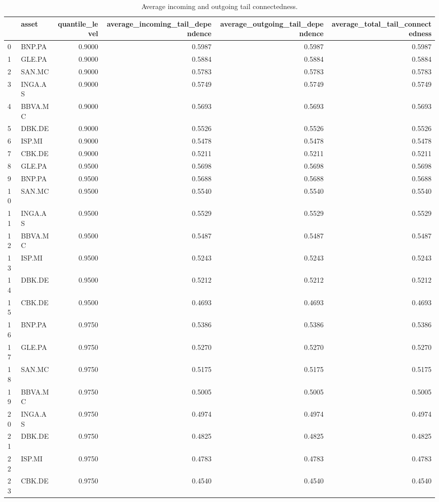 \begin{table}
\caption{Average incoming and outgoing tail connectedness.}
\label{tab:tail_connectedness_summary}
\begin{tabular}{llrrrr}
\toprule
 & asset & quantile_level & average_incoming_tail_dependence & average_outgoing_tail_dependence & average_total_tail_connectedness \\
\midrule
0 & BNP.PA & 0.9000 & 0.5987 & 0.5987 & 0.5987 \\
1 & GLE.PA & 0.9000 & 0.5884 & 0.5884 & 0.5884 \\
2 & SAN.MC & 0.9000 & 0.5783 & 0.5783 & 0.5783 \\
3 & INGA.AS & 0.9000 & 0.5749 & 0.5749 & 0.5749 \\
4 & BBVA.MC & 0.9000 & 0.5693 & 0.5693 & 0.5693 \\
5 & DBK.DE & 0.9000 & 0.5526 & 0.5526 & 0.5526 \\
6 & ISP.MI & 0.9000 & 0.5478 & 0.5478 & 0.5478 \\
7 & CBK.DE & 0.9000 & 0.5211 & 0.5211 & 0.5211 \\
8 & GLE.PA & 0.9500 & 0.5698 & 0.5698 & 0.5698 \\
9 & BNP.PA & 0.9500 & 0.5688 & 0.5688 & 0.5688 \\
10 & SAN.MC & 0.9500 & 0.5540 & 0.5540 & 0.5540 \\
11 & INGA.AS & 0.9500 & 0.5529 & 0.5529 & 0.5529 \\
12 & BBVA.MC & 0.9500 & 0.5487 & 0.5487 & 0.5487 \\
13 & ISP.MI & 0.9500 & 0.5243 & 0.5243 & 0.5243 \\
14 & DBK.DE & 0.9500 & 0.5212 & 0.5212 & 0.5212 \\
15 & CBK.DE & 0.9500 & 0.4693 & 0.4693 & 0.4693 \\
16 & BNP.PA & 0.9750 & 0.5386 & 0.5386 & 0.5386 \\
17 & GLE.PA & 0.9750 & 0.5270 & 0.5270 & 0.5270 \\
18 & SAN.MC & 0.9750 & 0.5175 & 0.5175 & 0.5175 \\
19 & BBVA.MC & 0.9750 & 0.5005 & 0.5005 & 0.5005 \\
20 & INGA.AS & 0.9750 & 0.4974 & 0.4974 & 0.4974 \\
21 & DBK.DE & 0.9750 & 0.4825 & 0.4825 & 0.4825 \\
22 & ISP.MI & 0.9750 & 0.4783 & 0.4783 & 0.4783 \\
23 & CBK.DE & 0.9750 & 0.4540 & 0.4540 & 0.4540 \\
\bottomrule
\end{tabular}
\end{table}
